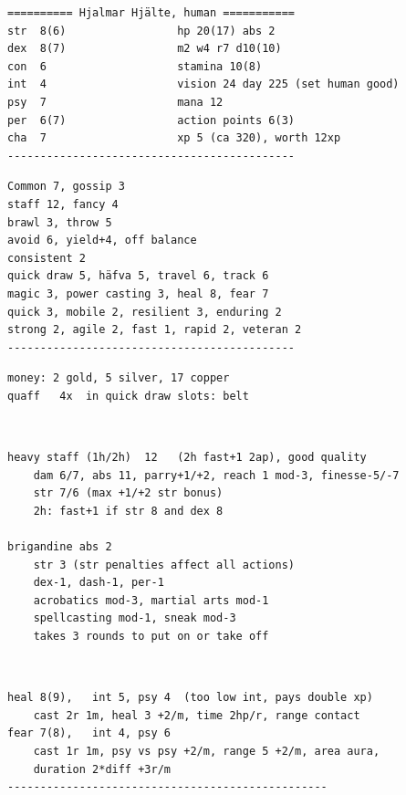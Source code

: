 \goodbreak \small \begin{samepage} \begin{verbatim}
========== Hjalmar Hjälte, human ===========
str  8(6)                 hp 20(17) abs 2
dex  8(7)                 m2 w4 r7 d10(10)
con  6                    stamina 10(8)
int  4                    vision 24 day 225 (set human good)
psy  7                    mana 12
per  6(7)                 action points 6(3)
cha  7                    xp 5 (ca 320), worth 12xp
--------------------------------------------
\end{verbatim} \end{samepage} \goodbreak \begin{samepage} \begin{verbatim}
Common 7, gossip 3
staff 12, fancy 4      
brawl 3, throw 5
avoid 6, yield+4, off balance
consistent 2
quick draw 5, häfva 5, travel 6, track 6
magic 3, power casting 3, heal 8, fear 7
quick 3, mobile 2, resilient 3, enduring 2
strong 2, agile 2, fast 1, rapid 2, veteran 2
--------------------------------------------
\end{verbatim} \end{samepage} \goodbreak \begin{samepage} \begin{verbatim}
money: 2 gold, 5 silver, 17 copper
quaff   4x  in quick draw slots: belt
\end{verbatim} \end{samepage}   \   \goodbreak \begin{samepage} \begin{verbatim}
heavy staff (1h/2h)  12   (2h fast+1 2ap), good quality
    dam 6/7, abs 11, parry+1/+2, reach 1 mod-3, finesse-5/-7
    str 7/6 (max +1/+2 str bonus)
    2h: fast+1 if str 8 and dex 8

brigandine abs 2
    str 3 (str penalties affect all actions)
    dex-1, dash-1, per-1
    acrobatics mod-3, martial arts mod-1
    spellcasting mod-1, sneak mod-3
    takes 3 rounds to put on or take off
\end{verbatim} \end{samepage}   \   \goodbreak \begin{samepage} \begin{verbatim}
heal 8(9),   int 5, psy 4  (too low int, pays double xp)
    cast 2r 1m, heal 3 +2/m, time 2hp/r, range contact
fear 7(8),   int 4, psy 6
    cast 1r 1m, psy vs psy +2/m, range 5 +2/m, area aura,
    duration 2*diff +3r/m
-------------------------------------------------
\end{verbatim} \end{samepage} \normalsize

